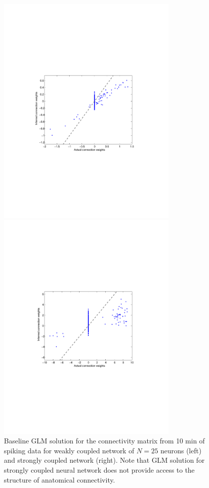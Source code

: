 \begin{figure}
\centering
\begin{minipage}[c]{0.45\hsize}
\includegraphics[width=250pt]{../figs/Figure8b_fluor_weak_glm}
\end{minipage}
\begin{minipage}[c]{0.45\hsize}
\includegraphics[width=250pt]{../figs/Figure8a_fluor_strong_glm}
\end{minipage}
\caption{Baseline GLM solution for the connectivity matrix from 10 min of spiking data for weakly coupled network of $N=25$ neurons (left) and strongly coupled network (right). Note that GLM solution for strongly coupled neural network does not provide access to the structure of anatomical connectivity.}
\label{fig:strongcouple}
\end{figure}
